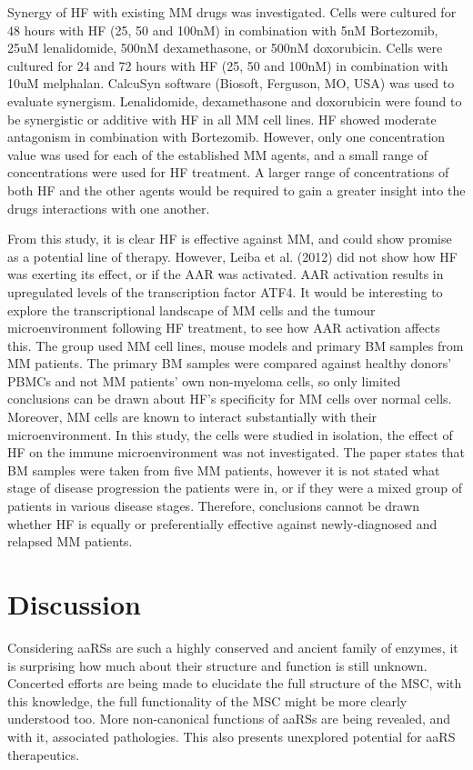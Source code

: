Synergy of HF with existing MM drugs was investigated\cite{leiba2012halofuginone}.
Cells were cultured for 48 hours with HF (25, 50 and 100nM) in combination with 5nM Bortezomib, 25uM lenalidomide, 500nM dexamethasone, or 500nM doxorubicin. Cells were cultured for 24 and 72 hours with HF (25, 50 and 100nM) in combination with 10uM melphalan.
CalcuSyn software (Biosoft, Ferguson, MO, USA) was used to evaluate synergism.
Lenalidomide, dexamethasone and doxorubicin were found to be synergistic or additive with HF in all MM cell lines.
HF showed moderate antagonism in combination with Bortezomib.
However, only one concentration value was used for each of the established MM agents, and a small range of concentrations were used for HF treatment.
A larger range of concentrations of both HF and the other agents would be required to gain a greater insight into the drugs interactions with one another.

From this study, it is clear HF is effective against MM, and could show promise as a potential line of therapy.
However, Leiba et al. (2012) did not show how HF was exerting its effect, or if the AAR was activated.
AAR activation results in upregulated levels of the transcription factor ATF4.
It would be interesting to explore the transcriptional landscape of MM cells and the tumour microenvironment following HF treatment, to see how AAR activation affects this.
The group used MM cell lines, mouse models and primary BM samples from MM patients.
The primary BM samples were compared against healthy donors' PBMCs and not MM patients' own non-myeloma cells, so only limited conclusions can be drawn about HF's specificity for MM cells over normal cells.
Moreover, MM cells are known to interact substantially with their microenvironment.
In this study, the cells were studied in isolation, the effect of HF on the immune microenvironment was not investigated.
The paper states that BM samples were taken from five MM patients, however it is not stated what stage of disease progression the patients were in, or if they were a mixed group of patients in various disease stages.
Therefore, conclusions cannot be drawn whether HF is equally or preferentially effective against newly-diagnosed and relapsed MM patients.

\section{Discussion}

Considering aaRSs are such a highly conserved and ancient family of enzymes, it is surprising how much about their structure and function is still unknown.
Concerted efforts are being made to elucidate the full structure of the MSC, with this knowledge, the full functionality of the MSC might be more clearly understood too.
More non-canonical functions of aaRSs are being revealed, and with it, associated pathologies.
This also presents unexplored potential for aaRS therapeutics.

